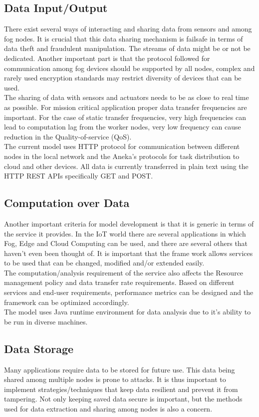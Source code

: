 \documentclass[AMA,STIX1COL]{WileyNJD-v2}
\begin{document}
\subsection{Data Input/Output}
There exist several ways of interacting and sharing data from sensors and among fog nodes. It is crucial that this data sharing mechanism is failsafe in terms of data theft and fraudulent manipulation. The streams of data might be or not be dedicated. Another important part is that the protocol followed for communication among fog devices should be supported by all nodes, complex and rarely used encryption standards may restrict diversity of devices that can be used. \\
The sharing of data with sensors and actuators needs to be as close to real time as possible. For mission critical application proper data transfer frequencies are important. For the case of static transfer frequencies, very high frequencies can lead to computation lag from the worker nodes, very low frequency can cause reduction in the Quality-of-service (QoS). \\
The current model uses HTTP protocol for communication between different nodes in the local network and the Aneka’s protocols for task distribution to cloud and other devices. All data is currently transferred in plain text using the HTTP REST APIs specifically GET and POST.

\subsection{Computation over Data}
Another important criteria for model development is that it is generic in terms of the service it provides. In the IoT world there are several applications in which Fog, Edge and Cloud Computing can be used, and there are several others that haven’t even been thought of. It is important that the frame work allows services to be used that can be changed, modified and/or extended easily. \\
The computation/analysis requirement of the service also affects the Resource management policy and data transfer rate requirements. Based on different services and end-user requirements, performance metrics can be designed and the framework can be optimized accordingly.\\
The model uses Java runtime environment for data analysis due to it’s ability to be run in diverse machines. 

\subsection{Data Storage}
Many applications require data to be stored for future use. This data being shared among multiple nodes is prone to attacks. It is thus important to implement strategies/techniques that keep data resilient and prevent it from tampering. Not only keeping saved data secure is important, but the methods used for data extraction and sharing among nodes is also a concern.
\end{document}
